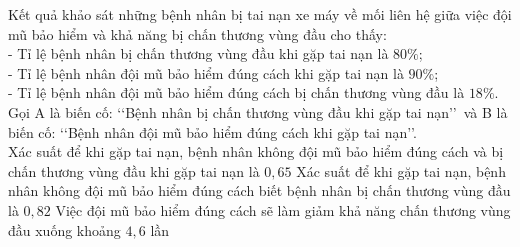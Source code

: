 \begin{vd}%
	Kết quả khảo sát những bệnh nhân bị tai nạn xe máy về mối liên hệ giữa việc đội mũ bảo hiểm và khả năng bị chấn thương vùng đầu cho thấy:\\
	- Tỉ lệ bệnh nhân bị chấn thương vùng đầu khi gặp tai nạn là $80 \%$;\\
	- Tỉ lệ bệnh nhân đội mũ bảo hiểm đúng cách khi gặp tai nạn là $90 \%$;\\
	- Tỉ lệ bệnh nhân đội mũ bảo hiểm đúng cách bị chấn thương vùng đầu là $18 \%$.\\
	Gọi A là biến cố: \lq\lq Bệnh nhân bị chấn thương vùng đầu khi gặp tai nạn\rq\rq\, và B là biến cố: \lq\lq Bệnh nhân đội mũ bảo hiểm đúng cách khi gặp tai nạn\rq\rq.\\
	{Xác suất để khi gặp tai nạn, bệnh nhân không đội mũ bảo hiểm đúng cách và bị chấn thương vùng đầu khi gặp tai nạn là $0{,}65$}
	{\True Xác suất để khi gặp tai nạn, bệnh nhân không đội mũ bảo hiểm đúng cách biết bệnh nhân bị chấn thương vùng đầu là $0{,}82$}
	{\True Việc đội mũ bảo hiểm đúng cách sẽ làm giảm khả năng chấn thương vùng đầu xuống khoảng $4{,}6$ lần}
\end{vd}

